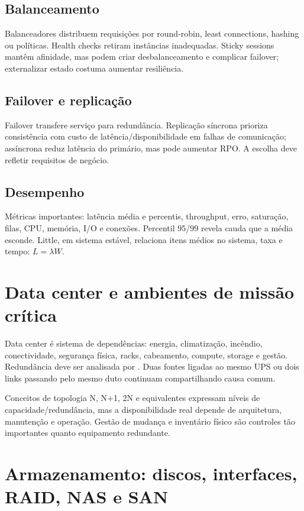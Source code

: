\subsection{Balanceamento}

Balanceadores distribuem requisições por round-robin, least connections, hashing ou políticas. Health checks retiram instâncias inadequadas. Sticky sessions mantêm afinidade, mas podem criar desbalanceamento e complicar failover; externalizar estado costuma aumentar resiliência.

\subsection{Failover e replicação}

Failover transfere serviço para redundância. Replicação síncrona prioriza consistência com custo de latência/disponibilidade em falhas de comunicação; assíncrona reduz latência do primário, mas pode aumentar RPO. A escolha deve refletir requisitos de negócio.

\subsection{Desempenho}

Métricas importantes: latência média e percentis, throughput, erro, saturação, filas, CPU, memória, I/O e conexões. Percentil 95/99 revela cauda que a média esconde. Little, em sistema estável, relaciona itens médios no sistema, taxa e tempo: $L=\lambda W$.

\section{Data center e ambientes de missão crítica}

Data center é sistema de dependências: energia, climatização, incêndio, conectividade, segurança física, racks, cabeamento, compute, storage e gestão. Redundância deve ser analisada por . Duas fontes ligadas ao mesmo UPS ou dois links passando pelo mesmo duto continuam compartilhando causa comum.

Conceitos de topologia N, N+1, 2N e equivalentes expressam níveis de capacidade/redundância, mas a disponibilidade real depende de arquitetura, manutenção e operação. Gestão de mudança e inventário físico são controles tão importantes quanto equipamento redundante.

\section{Armazenamento: discos, interfaces, RAID, NAS e SAN}

